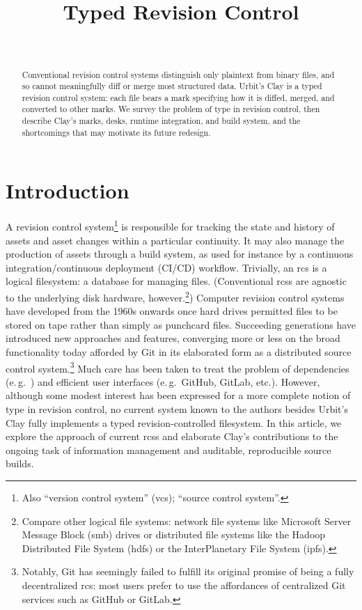 \documentclass[twoside]{article}
\title{Typed Revision Control}
\author{\authorname~\authorpatp \\ \affiliation}
\date{}
\begin{document}
\maketitle
\thispagestyle{firststyle}

\begin{abstract}
  Conventional revision control systems distinguish only plaintext from binary files, and so cannot meaningfully diff or merge most structured data. Urbit's Clay is a typed revision control system: each file bears a mark specifying how it is diffed, merged, and converted to other marks. We survey the problem of type in revision control, then describe Clay's marks, desks, runtime integration, and build system, and the shortcomings that may motivate its future redesign.
\end{abstract}

\setcounter{page}{35}

\tableofcontents

\section{Introduction}

A revision control system\footnote{Also “version control system” ({\sc vcs}); “source control system”.} is responsible for tracking the state and history of assets and asset changes within a particular continuity.  It may also manage the production of assets through a build system, as used for instance by a continuous integration/continuous deployment (CI/CD) workflow.  Trivially, an {\sc rcs} is a logical filesystem:  a database for managing files.  (Conventional {\sc rcs}s are agnostic to the underlying disk hardware, however.\footnote{Compare other logical file systems:  network file systems like Microsoft Server Message Block ({\sc smb}) drives or distributed file systems like the Hadoop Distributed File System ({\sc hdfs}) or the InterPlanetary File System ({\sc ipfs}).})  Computer revision control systems have developed from the 1960s onwards once hard drives permitted files to be stored on tape rather than simply as punchcard files.  Succeeding generations have introduced new approaches and features, converging more or less on the broad functionality today afforded by Git \citep{Torvalds2005} in its elaborated form as a distributed source control system.\footnote{Notably, Git has seemingly failed to fulfill its original promise of being a fully decentralized {\sc rcs}:  most users prefer to use the affordances of centralized Git services such as GitHub or GitLab.}  Much care has been taken to treat the problem of dependencies (e.\,g.\ \citet{Ball2015}) and efficient user interfaces (e.\,g.\ GitHub, GitLab, etc.).  However, although some modest interest has been expressed for a more complete notion of type in revision control, no current system known to the authors besides Urbit's Clay fully implements a typed revision-controlled filesystem.  In this article, we explore the approach of current {\sc rcs}s and elaborate Clay's contributions to the ongoing task of information management and auditable, reproducible source builds.
\end{document}
